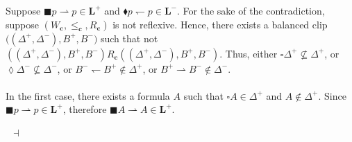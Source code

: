 \documentclass[draft]{article}
\newenvironment{proof}{{\bf Proof:}}{~$\dashv$\\}
\def\L{\mathbf{L}}
\begin{document}
\begin{proof}
%
%
%
%
%
Suppose ${\blacksquare}p{\rightharpoonup}p{\in}\L^{+}$ and ${\blacklozenge}p{\leftharpoondown}p{\in}\L^{-}$.
For the sake of the contradiction, suppose $(W_{\mathbf{c}},{\leq_{\mathbf{c}}},{R_{\mathbf{c}}})$ is not reflexive.
Hence, there exists a balanced clip $((\Delta^{+},\Delta^{-}),
%
%
%
%
%
%
%
$\linebreak$
%
%
%
%
%
%
B^{+},B^{-})$ such that not $((\Delta^{+},\Delta^{-}),B^{+},B^{-}){R_{\mathbf{c}}}((\Delta^{+},\Delta^{-}),B^{+},B^{-})$.
Thus, either ${\square}\Delta^{+}{\not\subseteq}\Delta^{+}$, or ${\lozenge}\Delta^{-}{\not\subseteq}\Delta^{-}$, or $B^{-}{\leftharpoondown}B^{+}{\not\in}\Delta^{+}$, or $B^{+}{\rightharpoonup}B^{-}{\not\in}\Delta^{-}$.
%
%
\\
\\
%
%
In the first case, there exists a formula $A$ such that ${\square}A{\in}\Delta^{+}$ and $A{\not\in}\Delta^{+}$.
Since ${\blacksquare}p{\rightharpoonup}p{\in}\L^{+}$, therefore ${\blacksquare}A{\rightharpoonup}A{\in}\L^{+}$.

\end{proof}
\end{document}
